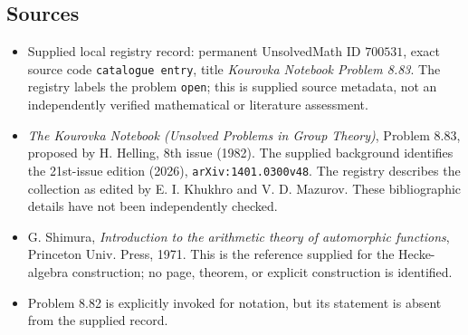 \documentclass[11pt]{article}
\begin{document}
\subsection{Sources}
\begin{itemize}
\item Supplied local registry record: permanent UnsolvedMath ID \(700531\), exact source code \texttt{catalogue entry}, title \emph{Kourovka Notebook Problem 8.83}. The registry labels the problem \texttt{open}; this is supplied source metadata, not an independently verified mathematical or literature assessment.
\item \emph{The Kourovka Notebook (Unsolved Problems in Group Theory)}, Problem 8.83, proposed by H. Helling, 8th issue (1982). The supplied background identifies the 21st-issue edition (2026), \texttt{arXiv:1401.0300v48}. The registry describes the collection as edited by E. I. Khukhro and V. D. Mazurov. These bibliographic details have not been independently checked.
\item G. Shimura, \emph{Introduction to the arithmetic theory of automorphic functions}, Princeton Univ. Press, 1971. This is the reference supplied for the Hecke-algebra construction; no page, theorem, or explicit construction is identified.
\item Problem 8.82 is explicitly invoked for notation, but its statement is absent from the supplied record.
\end{itemize}
\end{document}
